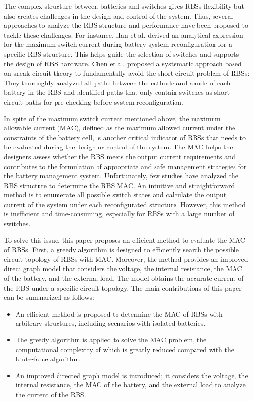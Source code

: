 \documentclass{article}
\begin{document}
The complex structure between batteries and switches gives RBSs flexibility but also creates challenges in the design and control of the system. 
Thus, several approaches to analyze the RBS structure and performance have been proposed to tackle these challenges.
For instance, 
Han et al. \cite{han2021analysis} derived an analytical expression for the maximum switch current during battery system reconfiguration for a specific RBS structure. 
This helps guide the selection of switches and supports the design of RBS hardware.
Chen et al. \cite{chenSneakCircuitTheory2021} proposed a systematic approach based on  sneak circuit theory to fundamentally avoid the short-circuit problem of RBSs: 
They thoroughly analyzed all paths between the cathode and anode of each battery in the RBS and identified paths that only contain switches as short-circuit paths for pre-checking before system reconfiguration. 


In spite of the maximum switch current mentioned above, the maximum allowable current (MAC), defined as the maximum allowed current  under the constraints of the battery cell, is another critical indicator of RBSs that needs to be evaluated during the design or control  of the system. 
The MAC helps the designers assess whether the RBS meets the output current requirements and contributes to the formulation of appropriate and safe management strategies for the battery management system.
Unfortunately, few studies have analyzed the RBS structure to determine the RBS MAC.
An intuitive and straightforward method is to enumerate all possible switch states and calculate the output current of the system under each reconfigurated structure.
However, this method is inefficient and time-consuming, especially for RBSs with a large number of switches.


To solve this issue, this paper proposes an efficient method to evaluate the MAC of RBSs. 
First, a greedy algorithm is designed to efficiently search the possible circuit topology of RBSs with MAC.
Moreover, the method provides an improved direct graph model that considers the voltage, the internal resistance, the MAC of the battery, and the external load. The model obtains the accurate current of the RBS under a specific circuit topology. 
The main contributions of this paper can be summarized as follows:
\begin{itemize}
  \item An efficient method is proposed to determine the MAC of RBSs with arbitrary structures, including scenarios with isolated batteries.
  \item The greedy algorithm is applied to solve the MAC problem, the computational complexity of which is greatly reduced compared with the brute-force algorithm.
  \item An improved directed graph model is introduced; it considers the voltage, the internal resistance, the MAC of the battery, and the external load to analyze the current of the RBS.
\end{itemize}
\end{document}
